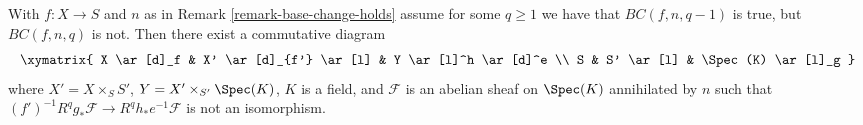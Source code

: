 %
\begin{lemma}
\label{lemma-base-change-does-not-hold-pre}
With $f : X \to S$ and $n$ as in Remark \ref{remark-base-change-holds}
assume for some $q \geq 1$ we have that $BC(f, n, q - 1)$ is true, but
$BC(f, n, q)$ is not. Then there exist a commutative diagram
$$
\xymatrix{
X \ar[d]_f & X' \ar[d]_{f'} \ar[l] & Y \ar[l]^h \ar[d]^e \\
S & S' \ar[l] & \Spec(K) \ar[l]_g
}
$$
where $X' = X \times_S S'$, $Y = X' \times_{S'} \Spec(K)$,
$K$ is a field, and $\mathcal{F}$ is an abelian sheaf
on $\Spec(K)$ annihilated by $n$ such that
$(f')^{-1}R^qg_*\mathcal{F} \to R^qh_*e^{-1}\mathcal{F}$
is not an isomorphism.
\end{lemma}


